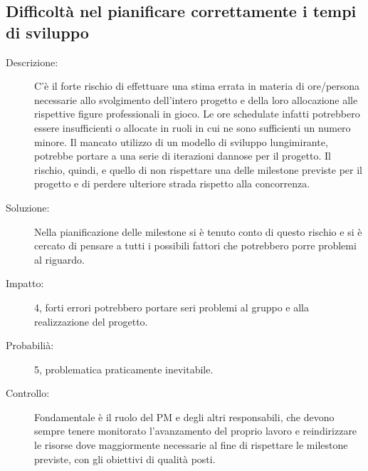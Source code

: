 \subsection{Difficoltà nel pianificare correttamente i tempi di sviluppo}
\begin{description}
\item[Descrizione:] C'è il forte rischio di effettuare una stima errata in materia di ore/persona necessarie allo svolgimento dell'intero progetto e della loro allocazione alle rispettive figure professionali in gioco. Le ore schedulate infatti potrebbero essere
insufficienti o allocate in ruoli in cui ne sono sufficienti un numero minore. Il mancato utilizzo
di un modello di sviluppo lungimirante, potrebbe portare a una serie di
iterazioni dannose per il progetto. Il rischio, quindi, e quello di non rispettare una
delle milestone previste per il progetto e di perdere ulteriore strada rispetto alla concorrenza.
\item[Soluzione:] Nella pianificazione delle milestone si è tenuto conto di questo rischio e si è
cercato di pensare a tutti i possibili fattori che potrebbero porre problemi al riguardo.
\item[Impatto:] 4, forti errori potrebbero portare seri problemi al gruppo e alla realizzazione del progetto.
\item[Probabilià:] 5, problematica praticamente inevitabile.
\item[Controllo:] Fondamentale è il ruolo del PM e degli altri responsabili, che devono sempre
tenere monitorato l'avanzamento del proprio lavoro e reindirizzare le risorse
dove maggiormente necessarie al fine di rispettare le milestone previste, con gli
obiettivi di qualità posti.
\end{description}

